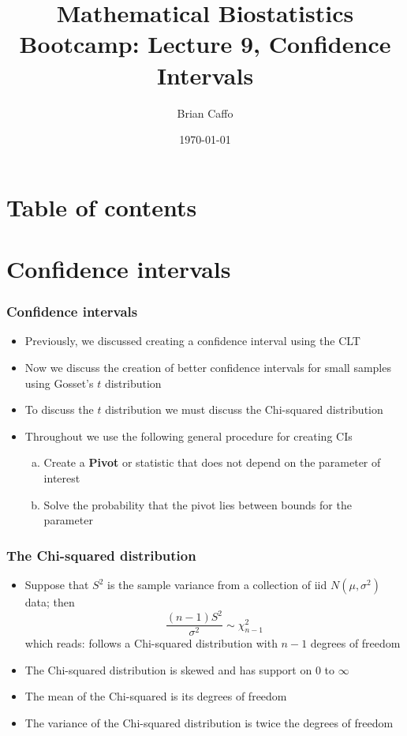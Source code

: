 \documentclass[aspectratio=169]{beamer}
\title{Mathematical Biostatistics Bootcamp: Lecture 9, Confidence Intervals}
\author{Brian Caffo}
\date{\today}
\institute[Department of Biostatistics]{
  Department of Biostatistics \\
  Johns Hopkins Bloomberg School of Public Health\\
  Johns Hopkins University
}
\begin{document}
\frame{\titlepage}


\section{Table of contents}


\section{Confidence intervals}
\begin{frame}\frametitle{Confidence intervals}
  \begin{itemize}
  \item Previously, we discussed creating a confidence interval using the CLT
  \item Now we discuss the creation of better confidence intervals for small
    samples using Gosset's $t$ distribution
  \item To discuss the $t$ distribution we must discuss the Chi-squared
    distribution
  \item Throughout we use the following general procedure for creating CIs
    \begin{enumerate}[a.]
    \item Create a {\bf Pivot} or statistic that does not depend on the
      parameter of interest
    \item Solve the probability that the pivot lies between bounds for 
    the parameter
  \end{enumerate}
\end{itemize}
\end{frame}

\begin{frame}\frametitle{The Chi-squared distribution}
  \begin{itemize}
  \item Suppose that $S^2$ is the sample variance from a collection of iid
    $N(\mu,\sigma^2)$ data; then 
    $$
    \frac{(n - 1) S^2}{\sigma^2} \sim \chi^2_{n-1}
    $$
    which reads: follows a Chi-squared distribution with $n-1$ degrees of freedom
  \item The Chi-squared distribution is skewed and has support on $0$ to $\infty$
  \item The mean of the Chi-squared is its degrees of freedom 
  \item The variance of the Chi-squared distribution is twice the degrees of freedom
  \end{itemize}
\end{frame}
\end{document}
